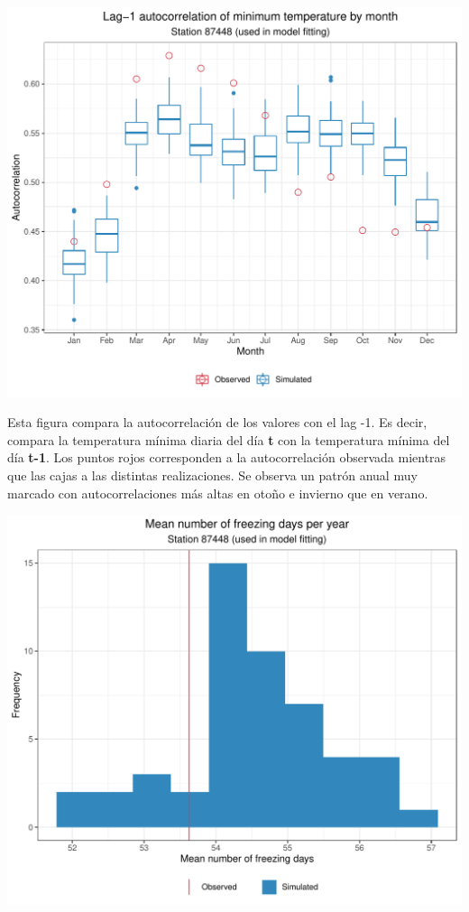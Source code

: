 \documentclass[
]{article}
\begin{document}
\begin{center}\includegraphics{Webinario_Generador_files/figure-latex/unnamed-chunk-51-1} \end{center}

Esta figura compara la autocorrelación de los valores con el lag -1. Es decir, compara la temperatura mínima diaria del día \textbf{t} con la temperatura mínima del día \textbf{t-1}. Los puntos rojos corresponden a la autocorrelación observada mientras que las cajas a las distintas realizaciones. Se observa un patrón anual muy marcado con autocorrelaciones más altas en otoño e invierno que en verano.

\begin{center}\includegraphics{Webinario_Generador_files/figure-latex/unnamed-chunk-52-1} \end{center}
\end{document}
